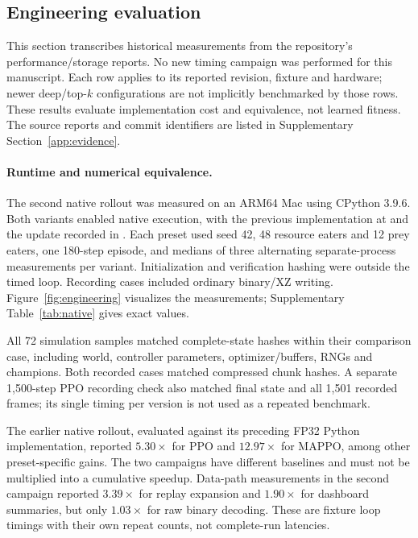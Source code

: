 \subsection{Engineering evaluation}\label{sec:engineering}
This section transcribes historical measurements from the repository's
performance/storage reports. No new timing campaign was performed for this
manuscript. Each row applies to its reported revision, fixture and hardware;
newer deep/top-$k$ configurations are not implicitly benchmarked by those rows.
These results evaluate implementation cost and equivalence, not learned fitness.
The source reports and commit identifiers are listed in
Supplementary Section~\ref{app:evidence}.

\paragraph{Runtime and numerical equivalence.}
The second native rollout was measured on an ARM64 Mac using CPython 3.9.6.
Both variants enabled native execution, with the previous implementation at
 and the update recorded in . Each preset used seed
42, 48 resource eaters and 12 prey eaters, one 180-step episode, and medians of
three alternating separate-process measurements per variant. Initialization and
verification hashing were outside the timed loop. Recording cases included
ordinary binary/XZ writing. Figure~\ref{fig:engineering} visualizes the measurements; Supplementary Table~\ref{tab:native} gives exact values.



All 72 simulation samples matched complete-state hashes within their comparison
case, including world, controller parameters, optimizer/buffers, RNGs and
champions. Both recorded cases matched compressed chunk hashes. A separate
1,500-step PPO recording check also matched final state and all 1,501 recorded
frames; its single timing per version is not used as a repeated benchmark.

The earlier native rollout, evaluated against its preceding FP32 Python
implementation, reported $5.30\times$ for PPO and $12.97\times$ for MAPPO, among
other preset-specific gains. The two campaigns have different baselines and
must not be multiplied into a cumulative speedup. Data-path measurements in the
second campaign reported $3.39\times$ for replay expansion and $1.90\times$ for
dashboard summaries, but only $1.03\times$ for raw binary decoding. These are
fixture loop timings with their own repeat counts, not complete-run latencies.

